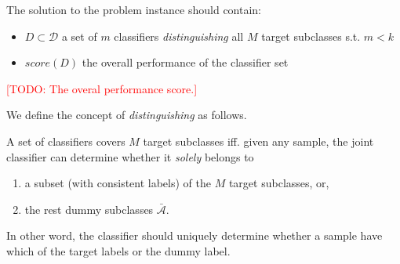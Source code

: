 \documentclass[sigplan,10pt,review]{acmart}\settopmatter{printfolios=true,printccs=false,printacmref=false}
\newcommand{\todo}[1]{\textcolor{red}{[TODO: #1]}}
\begin{document}
The solution to the problem instance should contain:
\begin{itemize}
	\item $D \subset \mathcal{D}$ a set of $m$ classifiers \textit{distinguishing} all $M$ target subclasses s.t. $m < k$
	\item $score(D)$ the overall performance of the classifier set
\end{itemize}

\todo{The overal performance score.}

We define the concept of \textit{distinguishing} as follows.
\begin{definition}
	A set of classifiers covers $M$ target subclasses iff. given any sample, the joint classifier can determine whether it \textit{solely} belongs to \begin{enumerate}
		\item a subset (with consistent labels) of the $M$ target subclasses, or,
		\item the rest dummy subclasses $\bar{\mathcal{A}}$.
	\end{enumerate}
\end{definition}
In other word, the classifier should uniquely determine whether a sample have which of the target labels or the dummy label.
\end{document}
